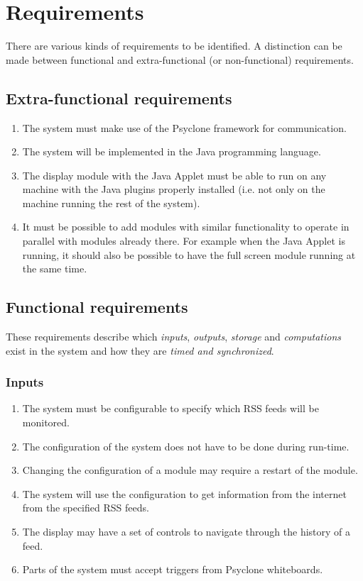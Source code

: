 \chapter{\label{cpt:requirements}Requirements}

There are various kinds of requirements to be identified. A distinction can be
made between functional and extra-functional (or non-functional) requirements.

\section{Extra-functional requirements}

\begin{enumerate}
  \item The system must make use of the Psyclone framework for communication.
  \item The system will be implemented in the Java programming language.
  \item The display module with the Java Applet must be able to run on any
        machine with the Java plugins properly installed (i.e. not only on the
        machine running the rest of the system).
  \item It must be possible to add modules with similar functionality to
        operate in parallel with modules already there. For example when the
        Java Applet is running, it should also be possible to have the full
        screen module running at the same time. 
\end{enumerate}

\section{Functional requirements}

These requirements describe which \emph{inputs}, \emph{outputs}, \emph{storage}
and \emph{computations} exist in the system and how they are \emph{timed and
synchronized}.

\subsection{Inputs}

\begin{enumerate}
  \item The system must be configurable to specify which RSS feeds will be
        monitored.
  \item The configuration of the system does not have to be done during run-time.
  \item Changing the configuration of a module may require a restart of the
        module.
  \item The system will use the configuration to get information from the
        internet from the specified RSS feeds.
  \item The display may have a set of controls to navigate through the history
        of a feed.
  \item Parts of the system must accept triggers from Psyclone whiteboards.
\end{enumerate}


